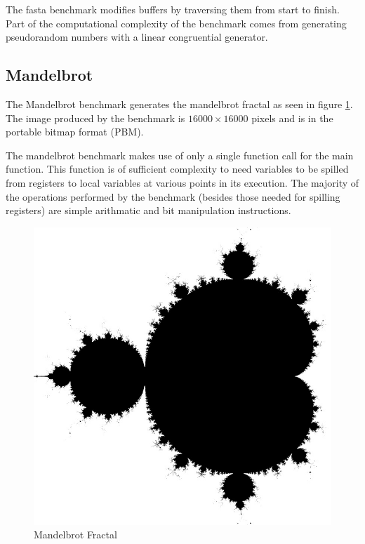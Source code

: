 \documentclass[english,a4paper,12pt]{report}
\begin{document}
The fasta benchmark modifies buffers by traversing them from start to
finish. Part of the computational complexity of the benchmark comes
from generating pseudorandom numbers with a linear congruential
generator.

\subsection{Mandelbrot}

The Mandelbrot benchmark generates the mandelbrot fractal as seen in
figure \ref{fig:mandel}. The image produced by the benchmark is
$16 000\times16 000$ pixels and is in the portable bitmap format (PBM).

The mandelbrot benchmark makes use of only a single function call for
the main function. This function is of sufficient complexity to need
variables to be spilled from registers to local variables at various
points in its execution. The majority of the operations performed by
the benchmark (besides those needed for spilling registers) are simple
arithmatic and bit manipulation instructions.

\begin{figure}
  \centering
  \includegraphics[scale=0.3]{mandelbrot.jpg}
  \caption{Mandelbrot Fractal}
  \label{fig:mandel}
\end{figure}
\end{document}
